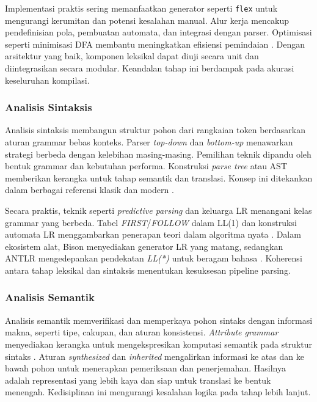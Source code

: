 \documentclass[../main.tex]{subfiles}
\begin{document}
Implementasi praktis sering memanfaatkan generator seperti \texttt{flex} untuk mengurangi kerumitan dan potensi kesalahan manual. Alur kerja mencakup pendefinisian pola, pembuatan automata, dan integrasi dengan parser. Optimisasi seperti minimisasi DFA membantu meningkatkan efisiensi pemindaian \citep{WikiDFAMin}. Dengan arsitektur yang baik, komponen leksikal dapat diuji secara unit dan diintegrasikan secara modular. Keandalan tahap ini berdampak pada akurasi keseluruhan kompilasi.

\subsubsection{Analisis Sintaksis}
Analisis sintaksis membangun struktur pohon dari rangkaian token berdasarkan aturan grammar bebas konteks. Parser \emph{top-down} dan \emph{bottom-up} menawarkan strategi berbeda dengan kelebihan masing-masing. Pemilihan teknik dipandu oleh bentuk grammar dan kebutuhan performa. Konstruksi \emph{parse tree} atau AST memberikan kerangka untuk tahap semantik dan translasi. Konsep ini ditekankan dalam berbagai referensi klasik dan modern \citep{Mogensen2010,Wirth1996,WikiLL,WikiLR}.

Secara praktis, teknik seperti \emph{predictive parsing} dan keluarga LR menangani kelas grammar yang berbeda. Tabel \emph{FIRST}/\emph{FOLLOW} dalam LL(1) dan konstruksi automata LR menggambarkan penerapan teori dalam algoritma nyata \citep{WikiFirstFollow,WikiSLR,WikiLALR}. Dalam ekosistem alat, Bison menyediakan generator LR yang matang, sedangkan ANTLR mengedepankan pendekatan \emph{LL(*)} untuk beragam bahasa \citep{BisonManual,ANTLRDocs}. Koherensi antara tahap leksikal dan sintaksis menentukan kesuksesan pipeline parsing.

\subsubsection{Analisis Semantik}
Analisis semantik memverifikasi dan memperkaya pohon sintaks dengan informasi makna, seperti tipe, cakupan, dan aturan konsistensi. \emph{Attribute grammar} menyediakan kerangka untuk mengekspresikan komputasi semantik pada struktur sintaks \citep{WikiAttributeGrammar}. Aturan \emph{synthesized} dan \emph{inherited} mengalirkan informasi ke atas dan ke bawah pohon untuk menerapkan pemeriksaan dan penerjemahan. Hasilnya adalah representasi yang lebih kaya dan siap untuk translasi ke bentuk menengah. Kedisiplinan ini mengurangi kesalahan logika pada tahap lebih lanjut.
\end{document}
